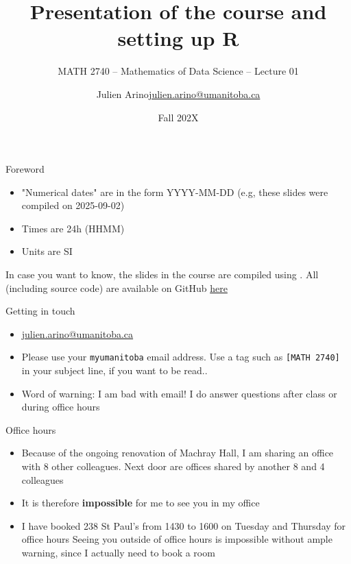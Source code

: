 \documentclass[aspectratio=169]{beamer}\usepackage[]{graphicx}\usepackage[]{xcolor}
\subtitle{MATH 2740 -- Mathematics of Data Science -- Lecture 01}
\author{\texorpdfstring{Julien Arino\newline\url{julien.arino@umanitoba.ca}}{Julien Arino}}
\institute{Department of Mathematics @ University of Manitoba}
\date{Fall 202X}
\title{Presentation of the course and setting up R}
\begin{document}



\begin{frame}{Foreword}
\begin{itemize}
\item "Numerical dates" are in the form YYYY-MM-DD (e.g, these slides were compiled on 2025-09-02)
\vfill
\item Times are 24h (HHMM)
\vfill
\item Units are SI
\end{itemize}
\vfill
In case you want to know, the slides in the course are  compiled using . All (including source code) are available on GitHub \href{https://github.com/julien-arino/math2740-of-data-science}{here}
\end{frame}

\begin{frame}{Getting in touch}
\begin{itemize}
\item \href{mailto:julien.arino@umanitoba.ca}{julien.arino@umanitoba.ca}
\vfill
\item Please use your \texttt{myumanitoba} email address. Use a tag such as \texttt{[MATH 2740]} in your subject line, if you want to be read..
\vfill
\item Word of warning: I am bad with email! I do answer questions after class or during office hours
\end{itemize}
\end{frame}

\begin{frame}{Office hours}
\begin{itemize}
\item Because of the ongoing renovation of Machray Hall, I am sharing an office with 8 other colleagues. Next door are offices shared by another 8 and 4 colleagues
\vfill
\item It is therefore \textbf{impossible} for me to see you in my office
\vfill
\item I have booked 238 St Paul's from 1430 to 1600 on Tuesday and Thursday for office hours
\vfill
Seeing you outside of office hours is impossible without ample warning, since I actually need to book a room
\end{itemize}
\end{frame}
\end{document}
